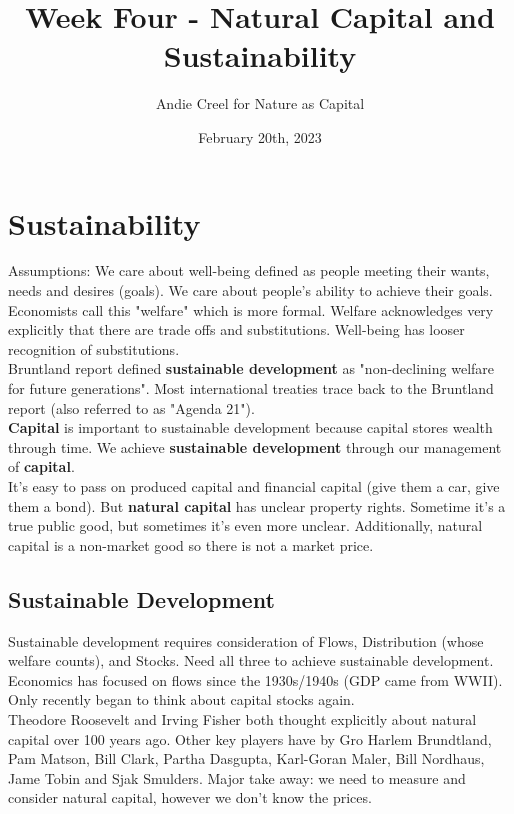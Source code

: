 \documentclass{article}
\title{Week Four - Natural Capital and Sustainability}
\author{Andie Creel for Nature as Capital}
\date{February 20th, 2023}
\begin{document}
\maketitle

\section{Sustainability}
Assumptions: We care about well-being defined as people meeting their wants, needs and desires (goals). We care about people's ability to achieve their goals. Economists call this "welfare" which is more formal. Welfare acknowledges very explicitly that there are trade offs and substitutions. Well-being has looser recognition of substitutions. \\

Bruntland report defined \textbf{sustainable development} as "non-declining welfare for future generations". Most international treaties trace back to the Bruntland report (also referred to as "Agenda 21"). \\

\textbf{Capital} is important to sustainable development because capital stores wealth through time. We achieve \textbf{sustainable development} through our management of \textbf{capital}. \\

It's easy to pass on produced capital and financial capital (give them a car, give them a bond). But \textbf{natural capital} has unclear property rights. Sometime it's a true public good, but sometimes it's even more unclear. Additionally, natural capital is a non-market good so there is not a market price. 

\subsection{Sustainable Development}
Sustainable development requires consideration of Flows, Distribution (whose welfare counts), and Stocks. Need all three to achieve sustainable development. Economics has focused on flows since the 1930s/1940s (GDP came from WWII). Only recently began to think about capital stocks again. \\

Theodore Roosevelt and Irving Fisher both thought explicitly about natural capital over 100 years ago. Other key players have by Gro Harlem Brundtland, Pam Matson, Bill Clark, Partha Dasgupta, Karl-Goran Maler, Bill Nordhaus, Jame Tobin and Sjak Smulders. Major take away: we need to measure and consider natural capital, however we don't know the prices. \\
\end{document}
